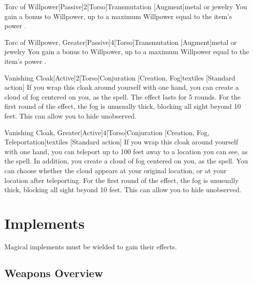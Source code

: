\begin{magicitemdef}{Torc of Willpower}[Passive]{2}[Torso]{Transmutation [Augment]}{metal or jewelry}
     You gain a  bonus to Willpower, up to a maximum Willpower equal to the item's power .
\end{magicitemdef}

\begin{magicitemdef}{Torc of Willpower, Greater}[Passive]{4}[Torso]{Transmutation [Augment]}{metal or jewelry}
     You gain a  bonus to Willpower, up to a maximum Willpower equal to the item's power .
\end{magicitemdef}

\begin{magicitemdef}{Vanishing Cloak}[Active]{2}[Torso]{Conjuration [Creation, Fog]}{textiles}
    [Standard action] If you wrap this cloak around yourself with one hand, you can create a cloud of fog centered on you, as the  spell.
    The effect lasts for 5 rounds.
    For the first round of the effect, the fog is unusually thick, blocking all sight beyond 10 feet.
    This can allow you to hide unobserved.
\end{magicitemdef}

\begin{magicitemdef}{Vanishing Cloak, Greater}[Active]{4}[Torso]{Conjuration [Creation, Fog, Teleportation]}{textiles}
    [Standard action] If you wrap this cloak around yourself with one hand, you can teleport up to 100 feet away to a location you can see, as the  spell.
    In addition, you create a cloud of fog centered on you, as the  spell.
    You can choose whether the cloud appears at your original location, or at your location after teleporting.
    For the first round of the effect, the fog is unusually thick, blocking all sight beyond 10 feet.
    This can allow you to hide unobserved.
\end{magicitemdef}

\section{Implements}
Magical implements must be wielded to gain their effects.

\subsection{Weapons Overview}

